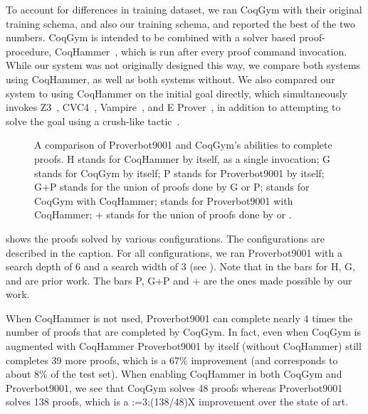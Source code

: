 \documentclass[sigplan,screen]{acmart}
\newcommand{\name}{Proverbot9001\xspace}
\newcommand{\PH}{138}
\renewcommand{\>}{\quad}
\begin{document}
To account for differences in training dataset,
  we ran CoqGym with their original training schema,
  and also our training schema,
  and reported the best of the two numbers.
CoqGym is intended to be combined with a solver based proof-procedure,
  CoqHammer~\cite{coqhammer}, which is run after every proof command invocation.
While our system was not originally designed this way,
  we compare both systems using CoqHammer,
  as well as both systems without.
We also compared our system to using CoqHammer on the initial goal directly,
  which simultaneously invokes Z3~\cite{z3}, CVC4~\cite{cvc4},
  Vampire~\cite{vampire}, and E Prover~\cite{eprover},
  in addition to attempting to solve the goal using a crush-like tactic~\cite{Chlipala}.

\begin{figure}
\caption{A comparison of Proverbot9001 and CoqGym's abilities to
  complete proofs.
H stands for CoqHammer by itself, as a single invocation;
G stands for CoqGym by itself;
P stands for \name{} by itself;
G+P stands for the union of proofs done by G or P;
 stands for CoqGym with CoqHammer;
 stands for Proverbot9001 with CoqHammer;
+ stands for the union of proofs done by  or .}
\label{fig:proofs-solved-bars}
\end{figure}

 shows the proofs solved by various configurations.
The configurations are described in the caption.
For all configurations,
  we ran \name{} with a search depth of 6 and a search width of 3
  (see ).
Note that in  the bars for H, G, and  are prior work.
The bars P, G+P and +
  are the ones made possible by our work.

When CoqHammer is not used, \name{} can complete nearly 4 times the number of proofs
  that are completed by CoqGym.
In fact, even when CoqGym is augmented with CoqHammer
  \name{} by itself (without CoqHammer) still completes 39 more proofs,
  which is a 67\% improvement (and corresponds to about 8\% of the test set).
When enabling CoqHammer in both CoqGym and \name{}, we see that CoqGym solves 48 proofs whereas \name{} solves \PH{} proofs, which is a \xintDigits:=3;\xintthefloatexpr(\PH/48)\relax X improvement over the state of art.
\end{document}
